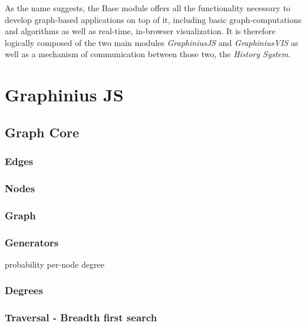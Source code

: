 As the name suggests, the Base module offers all the functionality necessary to develop graph-based applications on top of it, including basic graph-computations and algorithms as well as real-time, in-browser visualization. It is therefore logically composed of the two main modules \textit{GraphiniusJS} and \textit{GraphiniusVIS} as well as a mechanism of communication between those two, the \textit{History System}.


\section{Graphinius JS}
\label{sect:graphinius_js}

	\subsection{Graph Core}
	\label{ssect:graph_core}
		
		\subsubsection{Edges}
		\label{sssection: core_edges}
		
		\subsubsection{Nodes}
		\label{sssection: core_nodes}
		
		\subsubsection{Graph}
		\label{sssection: core_graph}
		
		\subsubsection{Generators}
		\label{sssection: core_}
		
		probability
		per-node degree
		
		\subsubsection{Degrees}
		\label{sssection: core_degrees}
		
		\subsubsection{Traversal - Breadth first search}
		\label{sssect:search_bfs}
		
